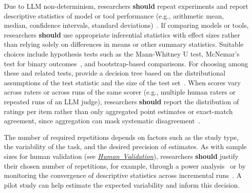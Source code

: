 \documentclass[smallextended]{svjour3}
\newcommand{\should}{\textbf{should}\xspace}
\newcommand{\humanvalidation}{\hyperref[sec:use-human-validation-for-llm-outputs]{\mbox{\emph{Human Validation}}}\xspace}
\newcommand{\humanvalidation}{\href{/guidelines/human-validation/}{\emph{Human Validation}}\xspace}
\begin{document}
Due to LLM non-determinism, researchers \should repeat experiments and report descriptive statistics of model or tool performance (e.g., arithmetic mean, median, confidence intervals, standard deviations)~\cite{DBLP:conf/nips/AgarwalSCCB21, DBLP:journals/corr/abs-2602-07150}. If comparing models or tools, researchers \should use appropriate inferential statistics with effect sizes rather than relying solely on differences in means or other summary statistics. Suitable choices include hypothesis tests such as the Mann-Whitney U test, McNemar's test for binary outcomes~\cite{DBLP:conf/iclr/KublerBKZYKK26}, and bootstrap-based comparisons. For choosing among these and related tests, \citeauthor{DBLP:conf/acl/DrorBSR18} provide a decision tree based on the distributional assumptions of the test statistic and the size of the test set~\cite{DBLP:conf/acl/DrorBSR18}. When scores vary across raters or across runs of the same scorer (e.g., multiple human raters or repeated runs of an LLM judge), researchers \should report the distribution of ratings per item rather than only aggregated point estimates or exact-match agreement, since aggregation can mask systematic disagreement~\cite{bean2025measuring}.

The number of required repetitions depends on factors such as the study type, the variability of the task, and the desired precision of estimates. As with sample sizes for human validation (see \humanvalidation), researchers \should justify their chosen number of repetitions, for example, through a power analysis~\cite{Cohen1992, DBLP:journals/corr/abs-2602-07150} or by monitoring the convergence of descriptive statistics across incremental runs~\cite{DBLP:journals/corr/abs-2410-03492}. A pilot study can help estimate the expected variability and inform this decision.
\end{document}

